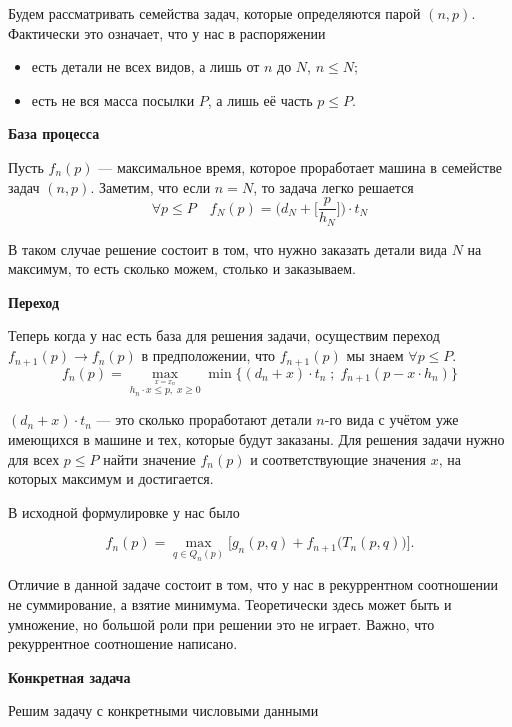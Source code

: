 \bigskip

Будем рассматривать семейства задач, которые определяются парой $(n, p)$. Фактически это означает, что у нас в распоряжении
\begin{itemize}[nosep]
	\item есть детали не всех видов, а лишь от $n$ до $N$, $n \le N$;
	
	\item есть не вся масса посылки $P$, а лишь её часть $p \le P$.
\end{itemize}

\bigskip

\textbf{База процесса}

Пусть $f_n(p)$ --- максимальное время, которое проработает машина в семействе задач $(n, p)$. Заметим, что если $n = N$, то задача легко решается
\[
\forall p \le P \quad f_N(p) = \bigg(d_N + \bigg[\frac{p}{h_N}\bigg]\bigg) \cdot t_N
\]

В таком случае решение состоит в том, что нужно заказать детали вида $N$ на максимум, то есть сколько можем, столько и заказываем.

\bigskip

\textbf{Переход}

Теперь когда у нас есть база для решения задачи, осуществим переход $f_{n+1}(p) \to f_n(p)$ в предположении, что $f_{n+1}(p)$ мы знаем $\forall p \le P$.
\[
\boxed{f_n(p) = \max_{\stackrel{x = x_n}{h_n \cdot x \le p, \; x \ge 0}} \min\Big\{(d_n + x) \cdot t_n \; ; \; f_{n+1}(p - x \cdot h_n)\Big\}}
\]

$(d_n + x) \cdot t_n$ --- это сколько проработают детали $n$-го вида с учётом уже имеющихся в машине и тех, которые будут заказаны. Для решения задачи нужно для всех $p \le P$ найти значение $f_n(p)$ и соответствующие значения $x$, на которых максимум и достигается.

В исходной формулировке у нас было

\[
f_n(p) = \max_{q \in Q_{n}(p)} \Big[g_n(p, q) + f_{n+1}\big(T_{n}(p, q)\big)\Big].
\]

Отличие в данной задаче состоит в том, что у нас в рекуррентном соотношении не суммирование, а взятие минимума. Теоретически здесь может быть и умножение, но большой роли при решении это не играет. Важно, что рекуррентное соотношение написано.

\bigskip

\textbf{Конкретная задача}

Решим задачу с конкретными числовыми данными

